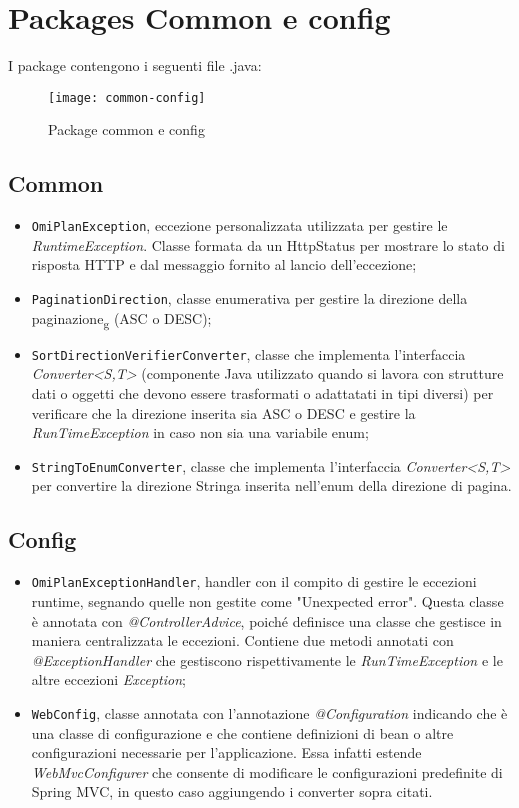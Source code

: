 \section{Packages Common e config}
I package contengono i seguenti file .java:

\begin{figure}[H] 
    \centering 
    \texttt{[image: common-config]} 
    \caption{Package common e config}
\end{figure}
\subsection{Common}
\begin{itemize}
\item \texttt{OmiPlanException}, eccezione personalizzata utilizzata per gestire le \textit{RuntimeException}. Classe formata da un HttpStatus per mostrare lo stato di risposta HTTP e dal messaggio fornito al lancio dell'eccezione;
\item \texttt{PaginationDirection}, classe enumerativa per gestire la direzione della paginazione\textsubscript{g} (ASC o DESC);
\item \texttt{SortDirectionVerifierConverter}, classe che implementa l'interfaccia \textit{Converter<S,T>} (componente Java utilizzato quando si lavora con strutture dati o oggetti che devono essere trasformati o adattatati in tipi diversi) per verificare che la direzione inserita sia ASC o DESC e gestire la \textit{RunTimeException} in caso non sia una variabile enum;
\item \texttt{StringToEnumConverter}, classe che implementa l'interfaccia \textit{Converter<S,T>} per convertire la direzione Stringa inserita nell'enum della direzione di pagina.
\end{itemize}

\subsection{Config}
\begin{itemize}
\item \texttt{OmiPlanExceptionHandler}, handler con il compito di gestire le eccezioni runtime, segnando quelle non gestite come "Unexpected error". Questa classe è annotata con \textit{@ControllerAdvice}, poiché definisce una classe che gestisce in maniera centralizzata le eccezioni. Contiene due metodi annotati con \textit{@ExceptionHandler} che gestiscono rispettivamente le \textit{RunTimeException} e le altre eccezioni \textit{Exception};
\item \texttt{WebConfig}, classe annotata con l'annotazione \textit{@Configuration} indicando che è una classe di configurazione e che contiene definizioni di bean o altre configurazioni necessarie per l'applicazione. Essa infatti estende \textit{WebMvcConfigurer} che consente di modificare le configurazioni predefinite di Spring MVC, in questo caso aggiungendo i converter sopra citati.
\end{itemize}